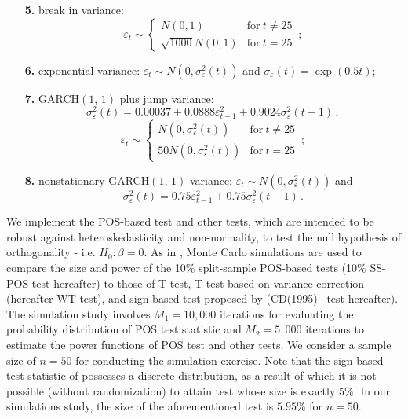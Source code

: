 \documentclass[harvard,11pt]{article}
\begin{document}
\begin{enumerate}
\item[\textbf{5.}] break in variance: 
\begin{equation*}
\varepsilon _{t}\sim \left\{ 
\begin{array}{cc}
N(0,1) & \text{for}\ t\neq 25 \\ 
\sqrt{1000}N(0,1) & \text{for}\ t=25%
\end{array}%
\,;\right.
\end{equation*}%
\item[\textbf{6.}] exponential variance: $\varepsilon_{t}\sim N(0,\sigma_{\varepsilon }^{2}(t))$ and $\sigma _{\varepsilon}(t)=\exp(0.5t)$;
\item[\textbf{7.}] GARCH$(1,\,1)$ plus jump variance:%
\begin{equation*}
\sigma _{\varepsilon }^{2}(t)=0.00037+0.0888\varepsilon
_{t-1}^{2}+0.9024\sigma _{\varepsilon }^{2}(t-1)\,,
\end{equation*}%
\begin{equation*}
\varepsilon _{t}\sim \left\{ 
\begin{array}{cc}
N(0,\sigma _{\varepsilon }^{2}(t)) & \text{for}\ t\neq 25 \\ 
50N(0,\sigma _{\varepsilon }^{2}(t)) & \text{for}\ t=25%
\end{array}%
\right. \,;
\end{equation*}%
\item[\textbf{8.}] nonstationary GARCH$(1,\,1)$ variance: $\varepsilon
_{t}\sim N(0,\sigma _{\varepsilon }^{2}(t))$ and%
\begin{equation*}
\sigma _{\varepsilon }^{2}(t)=0.75\varepsilon _{t-1}^{2}+0.75\sigma
_{\varepsilon }^{2}(t-1)\,.
\end{equation*}%
\end{enumerate}
We implement the POS-based test and other tests, which are intended to be robust against
heteroskedasticity and non-normality, to test the null hypothesis of orthogonality - i.e. $%
H_{0}:\beta =0.$ As in \citet{dufour2010exact}, Monte Carlo simulations are used to compare the size and
power of the 10\% split-sample POS-based tests (10\% SS-POS test hereafter) to those of T-test, T-test
based on \citet{white1980heteroskedasticity} variance correction (hereafter WT-test), and
sign-based test proposed by 
\citet{dufour1995exact} (CD(1995)%
\textit{\ }test hereafter). The simulation study involves $M_{1}=10,000$ iterations for evaluating the
probability distribution of POS test statistic and $M_{2}=5,000$ iterations
to estimate the power functions of POS test and other tests. We consider a sample size of $n=50$ for conducting the simulation exercise. 
Note that the sign-based test statistic of \citet{dufour1995exact} possesses a discrete distribution, as a result of which it is not possible
(without randomization) to attain test whose size is exactly $5\%.$ In our
simulations study, the size of the aforementioned test is $5.95\%$ for $n=50$.
\end{document}
